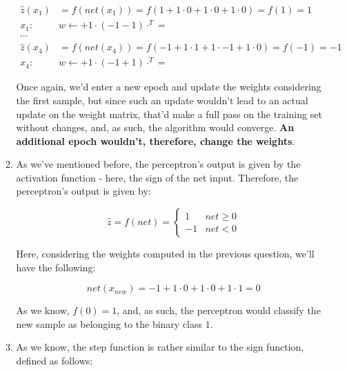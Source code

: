 \documentclass[12pt]{article}
\begin{document}
\begin{enumerate}[leftmargin=\labelsep]
\begin{enumerate}
{          \begin{align*}
            \hat{z}(x_1) & = f(net(x_1)) = f(1 + 1 \cdot 0 + 1 \cdot 0 + 1 \cdot 0) = f(1) = 1                                                                         \\
            x_1: \quad   & w \leftarrow  + 1 \cdot (-1 - 1) \cdot ^T =  \\
            \cdots                                                                                                                                                     \\
            \hat{z}(x_4) & = f(net(x_4)) = f(-1 + 1 \cdot 1 + 1 \cdot -1 + 1 \cdot 0) = f(-1) = -1                                                                     \\
            x_4: \quad   & w \leftarrow  + 1 \cdot (-1 + 1) \cdot ^T = 
          \end{align*}

          Once again, we'd enter a new epoch and update the weights considering the first sample,
          but since such an update wouldn't lead to an actual update on the weight matrix,
          that'd make a full pass on the training set without changes, and, as such,
          the algorithm would converge. \textbf{An additional epoch wouldn't, therefore,
            change the weights}.
          }
    \item {
          As we've mentioned before, the perceptron's output is given by the
          activation function - here, the sign of the net input. Therefore, the
          perceptron's output is given by:

          $$
            \hat{z} = f(net) = \begin{cases}
              1  & net \geq 0 \\
              -1 & net < 0
            \end{cases}
          $$

          Here, considering the weights computed in the previous question, we'll
          have the following:

          $$
            net(x_{new}) = -1 + 1 \cdot 0 + 1 \cdot 0 + 1 \cdot 1 = 0
          $$

          As we know, $f(0) = 1$, and, as such, the perceptron would classify the
          new sample as belonging to the binary class $1$.
          }
    \item {
          As we know, the step function is rather similar to the sign function,
          defined as follows:

}
\end{enumerate}
\end{enumerate}
\end{document}
